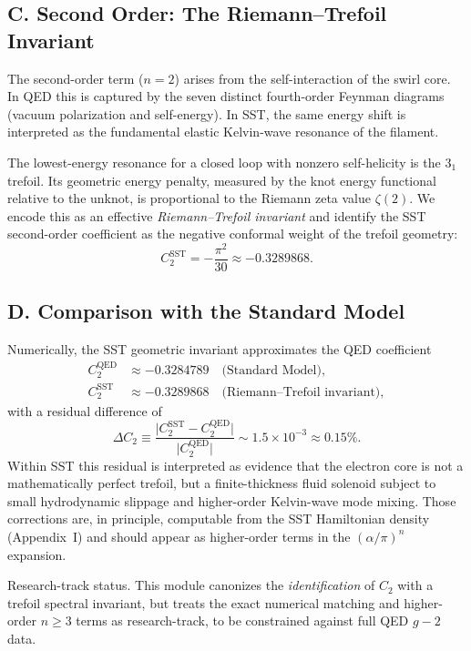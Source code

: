 \subsection*{C. Second Order: The Riemann--Trefoil Invariant}

    The second-order term ($n = 2$) arises from the self-interaction of the swirl core. In QED this is captured by the
    seven distinct fourth-order Feynman diagrams (vacuum polarization and self-energy). In SST, the same energy shift is
    interpreted as the fundamental elastic Kelvin-wave resonance of the filament.

    The lowest-energy resonance for a closed loop with nonzero self-helicity is the $3_1$ trefoil. Its geometric energy
    penalty, measured by the knot energy functional relative to the unknot, is proportional to the Riemann zeta value
    $\zeta(2)$. We encode this as an effective \emph{Riemann--Trefoil invariant} and identify the SST second-order
    coefficient as the negative conformal weight of the trefoil geometry:
    \begin{equation}
        C_2^{\text{SST}} = - \frac{\pi^2}{30} \approx -0.3289868 .
    \end{equation}

\subsection*{D. Comparison with the Standard Model}

    Numerically, the SST geometric invariant approximates the QED coefficient
    \begin{align}
        C_2^{\text{QED}} &\approx -0.3284789 \quad \text{(Standard Model)}, \\
        C_2^{\text{SST}} &\approx -0.3289868 \quad \text{(Riemann--Trefoil invariant)} ,
    \end{align}
    with a residual difference of
    \begin{equation}
        \Delta C_2 \equiv
        \frac{\bigl|C_2^{\text{SST}} - C_2^{\text{QED}}\bigr|}{\bigl|C_2^{\text{QED}}\bigr|}
        \sim 1.5 \times 10^{-3} \approx 0.15\% .
    \end{equation}
    Within SST this residual is interpreted as evidence that the electron core is not a mathematically perfect trefoil,
    but a finite-thickness fluid solenoid subject to small hydrodynamic slippage and higher-order Kelvin-wave mode
    mixing. Those corrections are, in principle, computable from the SST Hamiltonian density (Appendix~I)
    and should appear as higher-order terms in the $(\alpha/\pi)^n$ expansion.

    Research-track status. This module canonizes the \emph{identification} of $C_2$ with a trefoil spectral invariant,
    but treats the exact numerical matching and higher-order $n \ge 3$ terms as research-track, to be constrained against
    full QED $g-2$ data.